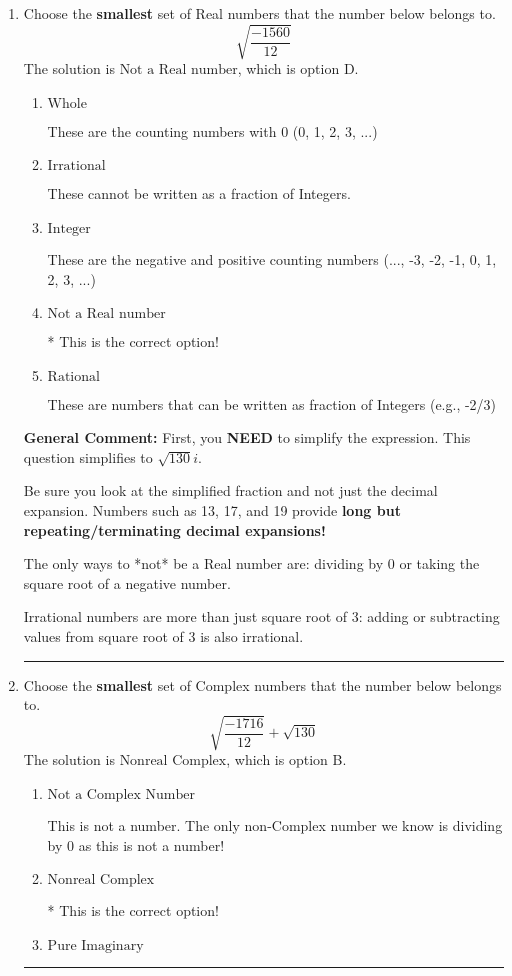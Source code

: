 \documentclass{extbook}[14pt]
\newcommand{\litem}[1]{\item #1

\rule{\textwidth}{0.4pt}}
\begin{document}
\begin{enumerate}\litem{
Choose the \textbf{smallest} set of Real numbers that the number below belongs to.
\[ \sqrt{\frac{-1560}{12}} \]
The solution is \( \text{Not a Real number} \), which is option D.\begin{enumerate}[label=\Alph*.]
\item \( \text{Whole} \)

These are the counting numbers with 0 (0, 1, 2, 3, ...)
\item \( \text{Irrational} \)

These cannot be written as a fraction of Integers.
\item \( \text{Integer} \)

These are the negative and positive counting numbers (..., -3, -2, -1, 0, 1, 2, 3, ...)
\item \( \text{Not a Real number} \)

* This is the correct option!
\item \( \text{Rational} \)

These are numbers that can be written as fraction of Integers (e.g., -2/3)
\end{enumerate}

\textbf{General Comment:} First, you \textbf{NEED} to simplify the expression. This question simplifies to $\sqrt{130} i$. 
 
 Be sure you look at the simplified fraction and not just the decimal expansion. Numbers such as 13, 17, and 19 provide \textbf{long but repeating/terminating decimal expansions!} 
 
 The only ways to *not* be a Real number are: dividing by 0 or taking the square root of a negative number. 
 
 Irrational numbers are more than just square root of 3: adding or subtracting values from square root of 3 is also irrational.
}
\litem{
Choose the \textbf{smallest} set of Complex numbers that the number below belongs to.
\[ \sqrt{\frac{-1716}{12}}+\sqrt{130} \]
The solution is \( \text{Nonreal Complex} \), which is option B.\begin{enumerate}[label=\Alph*.]
\item \( \text{Not a Complex Number} \)

This is not a number. The only non-Complex number we know is dividing by 0 as this is not a number!
\item \( \text{Nonreal Complex} \)

* This is the correct option!
\item \( \text{Pure Imaginary} \)


\end{enumerate}}
\end{enumerate}
\end{document}
